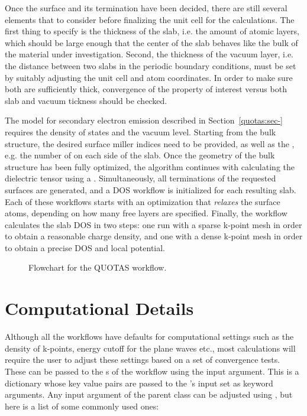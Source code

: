 \begin{refsection}
Once the surface and its termination have been decided, there are still several elements that to consider before finalizing the unit cell for the calculations. The first thing to specify is the thickness of the slab, i.e. the amount of atomic layers, which should be large enough that the center of the slab behaves like the bulk of the material under investigation. Second, the thickness of the vacuum layer, i.e. the distance between two slabs in the periodic boundary conditions, must be set by suitably adjusting the unit cell and atom coordinates. In order to make sure both are sufficiently thick, convergence of the property of interest versus both slab and vacuum tickness should be checked.

The model for secondary electron emission described in Section~\ref{quotas:sec-} requires the density of states and the vacuum level. Starting from the bulk structure, the desired surface miller indices need to be provided, as well as the , e.g. the number of  on each side of the slab. Once the geometry of the bulk structure has been fully optimized, the algorithm continues with calculating the dielectric tensor using a . Simultaneously, all terminations of the requested surfaces are generated, and a DOS workflow is initialized for each resulting slab. Each of these workflows starts with an optimization that \textit{relaxes} the surface atoms, depending on how many free layers are specified. Finally, the workflow calculates the slab DOS in two steps: one run with a sparse k-point mesh in order to obtain a reasonable charge density, and one with a dense k-point mesh in order to obtain a precise DOS and local potential.

\begin{figure}[ht]

\caption{\label{automation:fig-quotas} Flowchart for the QUOTAS workflow.}
\end{figure}

\section{\label{automation:sec-computational}Computational Details}

Although all the workflows have defaults for computational settings such as the density of k-points, energy cutoff for the plane waves etc., most calculations will require the user to adjust these settings based on a set of convergence tests. These can be passed to the s of the workflow using the  input argument. This is a dictionary whose key value pairs are passed to the 's input set as keyword arguments. Any input argument of the parent  class can be adjusted using , but here is a list of some commonly used ones:


\end{refsection}
